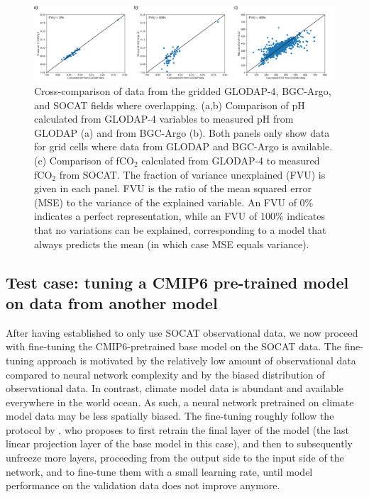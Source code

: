 \documentclass{article}
\begin{document}
	\begin{figure}
		\includegraphics[width=\textwidth]{./figures/consistency_GLODAP-bgc-argo_SOCAT.png}
		\caption{Cross-comparison of data from the gridded GLODAP-4, BGC-Argo, and SOCAT fields where overlapping. (a,b) Comparison of pH calculated from GLODAP-4 variables to measured pH from GLODAP (a) and from BGC-Argo (b). Both panels only show data for grid cells where data from GLODAP and BGC-Argo is available. (c) Comparison  of fCO$_2$ calculated from GLODAP-4 to measured fCO$_2$ from SOCAT. The fraction of variance unexplained (FVU) is given in each panel. FVU is the ratio of the mean squared error (MSE) to the variance of the explained variable. An FVU of 0\% indicates a perfect representation, while an FVU of 100\% indicates that no variations can be explained, corresponding to a model that always predicts the mean (in which case MSE equals variance).
		}
		\label{fig:cross-comparison}
	\end{figure}
	
	\subsection{Test case: tuning a CMIP6 pre-trained model on data from another model}
	\label{subsection:cmip6training}
	After having established to only use SOCAT observational data, we now proceed with fine-tuning the CMIP6-pretrained base model on the SOCAT data. The fine-tuning approach is motivated by the relatively low amount of observational data compared to neural network complexity and by the biased distribution of observational data. In contrast, climate model data is abundant and available everywhere in the world ocean. As such, a neural network pretrained on climate model data may be less spatially biased. The fine-tuning roughly follow the protocol by \cite{geron2019hands}, who proposes to first retrain the final layer of the model (the last linear projection layer of the base model in this case), and then to subsequently unfreeze more layers, proceeding from the output side to the input side of the network, and to fine-tune them with a small learning rate, until model performance on the validation data does not improve anymore. \\
	
\end{document}
